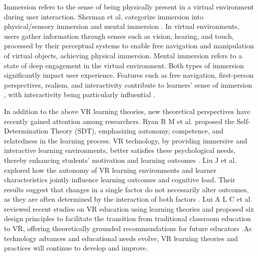 Immersion refers to the sense of being physically present in a virtual environment during user interaction. Sherman et al. categorize immersion into physical/sensory immersion and mental immersion \cite{sherman2003understanding}. In virtual environments, users gather information through senses such as vision, hearing, and touch, processed by their perceptual systems to enable free navigation and manipulation of virtual objects, achieving physical immersion. Mental immersion refers to a state of deep engagement in the virtual environment. Both types of immersion significantly impact user experience. Features such as free navigation, first-person perspectives, realism, and interactivity contribute to learners' sense of immersion \cite{regenbrecht2002real,mikropoulos2006presence}, with interactivity being particularly influential \cite{schubert2001experience}.

In addition to the above VR learning theories, new theoretical perspectives have recently gained attention among researchers. Ryan R M et al. proposed the Self-Determination Theory (SDT), emphasizing autonomy, competence, and relatedness in the learning process. VR technology, by providing immersive and interactive learning environments, better satisfies these psychological needs, thereby enhancing students' motivation and learning outcomes \cite{ryan2024self}. Liu J et al. explored how the autonomy of VR learning environments and learner characteristics jointly influence learning outcomes and cognitive load. Their results suggest that changes in a single factor do not necessarily alter outcomes, as they are often determined by the interaction of both factors \cite{liu2024autonomy}. Lui A L C et al. reviewed recent studies on VR education using learning theories and proposed six design principles to facilitate the transition from traditional classroom education to VR, offering theoretically grounded recommendations for future educators \cite{lui2023theory}.As technology advances and educational needs evolve, VR learning theories and practices will continue to develop and improve.

